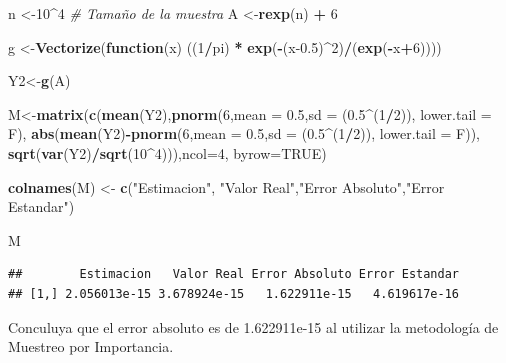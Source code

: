 \documentclass[
]{article}
\newenvironment{Shaded}{\begin{snugshade}}{\end{snugshade}}
\newcommand{\AttributeTok}[1]{\textcolor[rgb]{0.13,0.29,0.53}{#1}}
\newcommand{\CommentTok}[1]{\textcolor[rgb]{0.56,0.35,0.01}{\textit{#1}}}
\newcommand{\ConstantTok}[1]{\textcolor[rgb]{0.56,0.35,0.01}{#1}}
\newcommand{\ControlFlowTok}[1]{\textcolor[rgb]{0.13,0.29,0.53}{\textbf{#1}}}
\newcommand{\DecValTok}[1]{\textcolor[rgb]{0.00,0.00,0.81}{#1}}
\newcommand{\FloatTok}[1]{\textcolor[rgb]{0.00,0.00,0.81}{#1}}
\newcommand{\FunctionTok}[1]{\textcolor[rgb]{0.13,0.29,0.53}{\textbf{#1}}}
\newcommand{\NormalTok}[1]{#1}
\newcommand{\OtherTok}[1]{\textcolor[rgb]{0.56,0.35,0.01}{#1}}
\newcommand{\SpecialCharTok}[1]{\textcolor[rgb]{0.81,0.36,0.00}{\textbf{#1}}}
\newcommand{\StringTok}[1]{\textcolor[rgb]{0.31,0.60,0.02}{#1}}
\begin{document}
\begin{Shaded}
\begin{Highlighting}[]
\NormalTok{n }\OtherTok{\textless{}{-}}\DecValTok{10}\SpecialCharTok{\^{}}\DecValTok{4} \CommentTok{\# Tamaño de la muestra}
\NormalTok{A }\OtherTok{\textless{}{-}}\FunctionTok{rexp}\NormalTok{(n) }\SpecialCharTok{+} \DecValTok{6}

\NormalTok{g }\OtherTok{\textless{}{-}}\FunctionTok{Vectorize}\NormalTok{(}\ControlFlowTok{function}\NormalTok{(x) ((}\DecValTok{1}\SpecialCharTok{/}\NormalTok{pi) }\SpecialCharTok{*} \FunctionTok{exp}\NormalTok{(}\SpecialCharTok{{-}}\NormalTok{(x}\FloatTok{{-}0.5}\NormalTok{)}\SpecialCharTok{\^{}}\DecValTok{2}\NormalTok{)}\SpecialCharTok{/}\NormalTok{(}\FunctionTok{exp}\NormalTok{(}\SpecialCharTok{{-}}\NormalTok{x}\SpecialCharTok{+}\DecValTok{6}\NormalTok{))))}

\NormalTok{Y2}\OtherTok{\textless{}{-}}\FunctionTok{g}\NormalTok{(A)}

\NormalTok{M}\OtherTok{\textless{}{-}}\FunctionTok{matrix}\NormalTok{(}\FunctionTok{c}\NormalTok{(}\FunctionTok{mean}\NormalTok{(Y2),}\FunctionTok{pnorm}\NormalTok{(}\DecValTok{6}\NormalTok{,}\AttributeTok{mean =} \FloatTok{0.5}\NormalTok{,}\AttributeTok{sd =}\NormalTok{ (}\FloatTok{0.5}\SpecialCharTok{\^{}}\NormalTok{(}\DecValTok{1}\SpecialCharTok{/}\DecValTok{2}\NormalTok{)), }\AttributeTok{lower.tail =}\NormalTok{ F),}
            \FunctionTok{abs}\NormalTok{(}\FunctionTok{mean}\NormalTok{(Y2)}\SpecialCharTok{{-}}\FunctionTok{pnorm}\NormalTok{(}\DecValTok{6}\NormalTok{,}\AttributeTok{mean =} \FloatTok{0.5}\NormalTok{,}\AttributeTok{sd =}\NormalTok{ (}\FloatTok{0.5}\SpecialCharTok{\^{}}\NormalTok{(}\DecValTok{1}\SpecialCharTok{/}\DecValTok{2}\NormalTok{)), }\AttributeTok{lower.tail =}\NormalTok{ F)),}
            \FunctionTok{sqrt}\NormalTok{(}\FunctionTok{var}\NormalTok{(Y2)}\SpecialCharTok{/}\FunctionTok{sqrt}\NormalTok{(}\DecValTok{10}\SpecialCharTok{\^{}}\DecValTok{4}\NormalTok{))),}\AttributeTok{ncol=}\DecValTok{4}\NormalTok{, }\AttributeTok{byrow=}\ConstantTok{TRUE}\NormalTok{)}

\FunctionTok{colnames}\NormalTok{(M) }\OtherTok{\textless{}{-}} \FunctionTok{c}\NormalTok{(}\StringTok{"Estimacion"}\NormalTok{, }\StringTok{"Valor Real"}\NormalTok{,}\StringTok{"Error Absoluto"}\NormalTok{,}\StringTok{"Error Estandar"}\NormalTok{)}

\NormalTok{M}
\end{Highlighting}
\end{Shaded}

\begin{verbatim}
##        Estimacion   Valor Real Error Absoluto Error Estandar
## [1,] 2.056013e-15 3.678924e-15   1.622911e-15   4.619617e-16
\end{verbatim}

Conculuya que el error absoluto es de 1.622911e-15 al utilizar la
metodología de Muestreo por Importancia.
\end{document}
